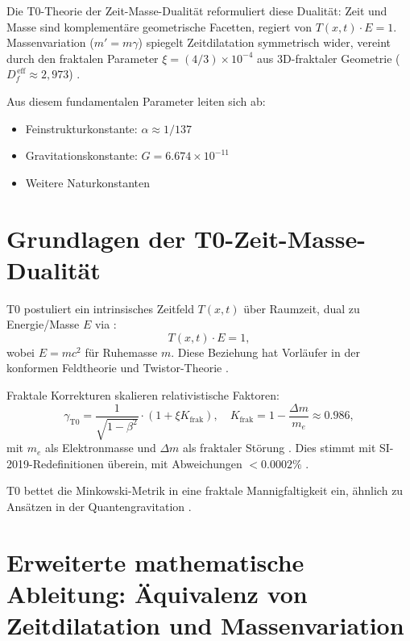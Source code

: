 	Die T0-Theorie der Zeit-Masse-Dualität \cite{pascher2025t0} reformuliert diese Dualität: Zeit und Masse sind komplementäre geometrische Facetten, regiert von $T(x,t) \cdot E = 1$. Massenvariation ($m' = m \gamma$) spiegelt Zeitdilatation symmetrisch wider, vereint durch den fraktalen Parameter $\xi = (4/3) \times 10^{-4}$ aus 3D-fraktaler Geometrie ($D_f^{\,\text{eff}} \approx 2{,}973$) \cite{pascher2025si, mandelbrot1982}. 
	
	Aus diesem fundamentalen Parameter leiten sich ab:
	\begin{itemize}
		\item Feinstrukturkonstante: $\alpha \approx 1/137$ \cite{pascher2025alpha}
		\item Gravitationskonstante: $G = 6.674 \times 10^{-11}$ \cite{pascher2025gravity}
		\item Weitere Naturkonstanten \cite{weinberg2008}
	\end{itemize}
	
	\section{Grundlagen der T0-Zeit-Masse-Dualität}
	T0 postuliert ein intrinsisches Zeitfeld $T(x,t)$ über Raumzeit, dual zu Energie/Masse $E$ via \cite{pascher2025qm, penrose2004}:
	\begin{equation}
		T(x,t) \cdot E = 1,
	\end{equation}
	wobei $E = m c^2$ für Ruhemasse $m$. Diese Beziehung hat Vorläufer in der konformen Feldtheorie \cite{francesco1997} und Twistor-Theorie \cite{penrose1967}.
	
	Fraktale Korrekturen skalieren relativistische Faktoren:
	\begin{equation}
		\gamma_\text{T0} = \frac{1}{\sqrt{1 - \beta^2}} \cdot (1 + \xi K_\text{frak}), \quad K_\text{frak} = 1 - \frac{\Delta m}{m_e} \approx 0.986,
	\end{equation}
	mit $m_e$ als Elektronmasse und $\Delta m$ als fraktaler Störung \cite{pascher2025si}. Dies stimmt mit SI-2019-Redefinitionen überein, mit Abweichungen $<0.0002\%$ \cite{codata2019, newell2018}.
	
	T0 bettet die Minkowski-Metrik in eine fraktale Mannigfaltigkeit ein, ähnlich zu Ansätzen in der Quantengravitation \cite{rovelli2004, thiemann2007}.
	
	\section{Erweiterte mathematische Ableitung: Äquivalenz von Zeitdilatation und Massenvariation}
	
